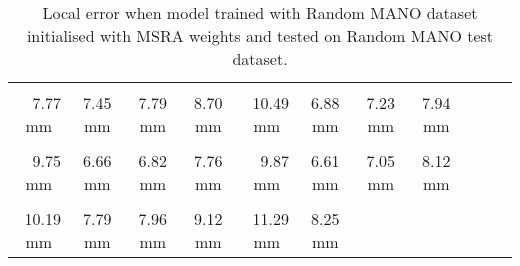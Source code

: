 \begin{table}[!ht]
    \begin{tabular}{|c|c|c|c|c|c|c|c|c|c|c|}
    \hline
    \cellcolor[HTML]{00ff00}{\bfseries Wrist} & \cellcolor[HTML]{00ff00}{\bfseries IMCP} & \cellcolor[HTML]{00ff00}{\bfseries IPIP} & \cellcolor[HTML]{00ff00}{\bfseries IDIP} & \cellcolor[HTML]{40ff00}{\bfseries ITIP} & \cellcolor[HTML]{00ff00}{\bfseries MMCP} & \cellcolor[HTML]{00ff00}{\bfseries MPIP} & \cellcolor[HTML]{00ff00}{\bfseries MDIP}  \\
    \cellcolor[HTML]{00ff00}$\,\,\,\,\,\,$7.77 mm & \cellcolor[HTML]{00ff00}$\,\,\,\,\,\,$7.45 mm & \cellcolor[HTML]{00ff00}$\,\,\,\,\,\,$7.79 mm & \cellcolor[HTML]{00ff00}$\,\,\,\,\,\,$8.70 mm & \cellcolor[HTML]{40ff00}$\,\,\,$10.49 mm & \cellcolor[HTML]{00ff00}$\,\,\,\,\,\,$6.88 mm & \cellcolor[HTML]{00ff00}$\,\,\,\,\,\,$7.23 mm & \cellcolor[HTML]{00ff00}$\,\,\,\,\,\,$7.94 mm\\
    \hline
    \cellcolor[HTML]{00ff00}{\bfseries MTIP} & \cellcolor[HTML]{00ff00}{\bfseries RMCP} & \cellcolor[HTML]{00ff00}{\bfseries RPIP} & \cellcolor[HTML]{00ff00}{\bfseries RDIP} & \cellcolor[HTML]{00ff00}{\bfseries RTIP} & \cellcolor[HTML]{00ff00}{\bfseries PMCP} & \cellcolor[HTML]{00ff00}{\bfseries PPIP} & \cellcolor[HTML]{00ff00}{\bfseries PDIP}  \\
    \cellcolor[HTML]{00ff00}$\,\,\,\,\,\,$9.75 mm & \cellcolor[HTML]{00ff00}$\,\,\,\,\,\,$6.66 mm & \cellcolor[HTML]{00ff00}$\,\,\,\,\,\,$6.82 mm & \cellcolor[HTML]{00ff00}$\,\,\,\,\,\,$7.76 mm & \cellcolor[HTML]{00ff00}$\,\,\,\,\,\,$9.87 mm & \cellcolor[HTML]{00ff00}$\,\,\,\,\,\,$6.61 mm & \cellcolor[HTML]{00ff00}$\,\,\,\,\,\,$7.05 mm & \cellcolor[HTML]{00ff00}$\,\,\,\,\,\,$8.12 mm\\
    \hline
    \cellcolor[HTML]{40ff00}{\bfseries PTIP} & \cellcolor[HTML]{00ff00}{\bfseries TMCP} & \cellcolor[HTML]{00ff00}{\bfseries TPIP} & \cellcolor[HTML]{00ff00}{\bfseries PDIP} & \cellcolor[HTML]{40ff00}{\bfseries TTIP} & \cellcolor[HTML]{00ff00}{\bfseries Average}  \\
    \cellcolor[HTML]{40ff00}$\,\,\,$10.19 mm & \cellcolor[HTML]{00ff00}$\,\,\,\,\,\,$7.79 mm & \cellcolor[HTML]{00ff00}$\,\,\,\,\,\,$7.96 mm & \cellcolor[HTML]{00ff00}$\,\,\,\,\,\,$9.12 mm & \cellcolor[HTML]{40ff00}$\,\,\,$11.29 mm & \cellcolor[HTML]{00ff00}$\,\,\,\,\,\,$8.25 mm \\
    \cline{1-6}
    \end{tabular}
    \caption{Local error when model trained with Random MANO dataset initialised with MSRA weights and tested on Random MANO test dataset.}
    \label{tb:omog}
    \end{table}
